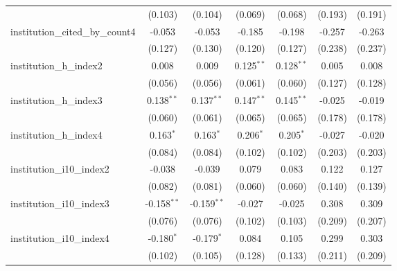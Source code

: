 \begin{tabular}{lcccccc}
                                         & (0.103)       & (0.104)       & (0.069)       & (0.068)       & (0.193)       & (0.191)\\   
   institution\_cited\_by\_count4        & -0.053        & -0.053        & -0.185        & -0.198        & -0.257        & -0.263\\   
                                         & (0.127)       & (0.130)       & (0.120)       & (0.127)       & (0.238)       & (0.237)\\   
   institution\_h\_index2                & 0.008         & 0.009         & 0.125$^{**}$  & 0.128$^{**}$  & 0.005         & 0.008\\   
                                         & (0.056)       & (0.056)       & (0.061)       & (0.060)       & (0.127)       & (0.128)\\   
   institution\_h\_index3                & 0.138$^{**}$  & 0.137$^{**}$  & 0.147$^{**}$  & 0.145$^{**}$  & -0.025        & -0.019\\   
                                         & (0.060)       & (0.061)       & (0.065)       & (0.065)       & (0.178)       & (0.178)\\   
   institution\_h\_index4                & 0.163$^{*}$   & 0.163$^{*}$   & 0.206$^{*}$   & 0.205$^{*}$   & -0.027        & -0.020\\   
                                         & (0.084)       & (0.084)       & (0.102)       & (0.102)       & (0.203)       & (0.203)\\   
   institution\_i10\_index2              & -0.038        & -0.039        & 0.079         & 0.083         & 0.122         & 0.127\\   
                                         & (0.082)       & (0.081)       & (0.060)       & (0.060)       & (0.140)       & (0.139)\\   
   institution\_i10\_index3              & -0.158$^{**}$ & -0.159$^{**}$ & -0.027        & -0.025        & 0.308         & 0.309\\   
                                         & (0.076)       & (0.076)       & (0.102)       & (0.103)       & (0.209)       & (0.207)\\   
   institution\_i10\_index4              & -0.180$^{*}$  & -0.179$^{*}$  & 0.084         & 0.105         & 0.299         & 0.303\\   
                                         & (0.102)       & (0.105)       & (0.128)       & (0.133)       & (0.211)       & (0.209)\\   

\end{tabular}
